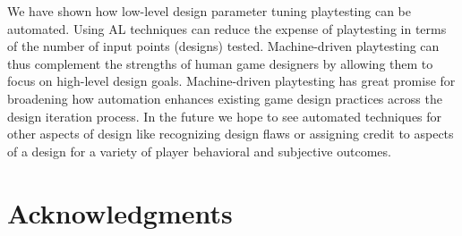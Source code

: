 \documentclass{sig-alternate}
\begin{document}


We have shown how low-level design parameter tuning playtesting can be automated.
Using AL techniques can reduce the expense of playtesting in terms of the number of input points (designs) tested.
Machine-driven playtesting can thus complement the strengths of human game designers by allowing them to focus on high-level design goals.
Machine-driven playtesting has great promise for broadening how automation enhances existing game design practices across the design iteration process.
In the future we hope to see automated techniques for other aspects of design like recognizing design flaws or assigning credit to aspects of a design for a variety of player behavioral and subjective outcomes.




\section{Acknowledgments}



\end{document}
